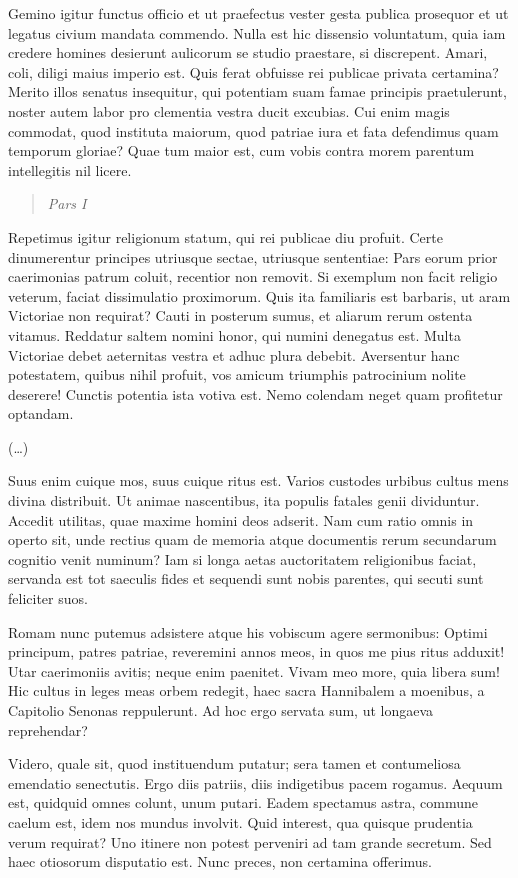 Gemino igitur functus officio et ut praefectus vester gesta publica prosequor et ut legatus civium mandata commendo. Nulla est hic dissensio voluntatum, quia iam credere homines desierunt aulicorum se studio praestare, si discrepent. Amari, coli, diligi maius imperio est. Quis ferat obfuisse rei publicae privata certamina? Merito illos senatus insequitur, qui potentiam suam famae principis praetulerunt, noster autem labor pro clementia vestra ducit excubias. Cui enim magis commodat, quod instituta maiorum, quod patriae iura et fata defendimus quam temporum gloriae? Quae tum maior est, cum vobis contra morem parentum intellegitis nil licere.

\begin{quote}
\textit{Pars I}
\end{quote}

Repetimus igitur religionum statum, qui rei publicae diu profuit. Certe dinumerentur principes utriusque sectae, utriusque sententiae: Pars eorum prior caerimonias patrum coluit, recentior non removit. Si exemplum non facit religio veterum, faciat dissimulatio proximorum. Quis ita familiaris est barbaris, ut aram Victoriae non requirat? Cauti in posterum sumus, et aliarum rerum ostenta vitamus. Reddatur saltem nomini honor, qui numini denegatus est. Multa Victoriae debet aeternitas vestra et adhuc plura debebit. Aversentur hanc potestatem, quibus nihil profuit, vos amicum triumphis patrocinium nolite deserere! Cunctis potentia ista votiva est. Nemo colendam neget quam profitetur optandam.

(\dots)

Suus enim cuique mos, suus cuique ritus est. Varios custodes urbibus cultus mens divina distribuit. Ut animae nascentibus, ita populis fatales genii dividuntur. Accedit utilitas, quae maxime homini deos adserit. Nam cum ratio omnis in operto sit, unde rectius quam de memoria atque documentis rerum secundarum cognitio venit numinum? Iam si longa aetas auctoritatem religionibus faciat, servanda est tot saeculis fides et sequendi sunt nobis parentes, qui secuti sunt feliciter suos.

Romam nunc putemus adsistere atque his vobiscum agere sermonibus: Optimi principum, patres patriae, reveremini annos meos, in quos me pius ritus adduxit! Utar caerimoniis avitis; neque enim paenitet. Vivam meo more, quia libera sum! Hic cultus in leges meas orbem redegit, haec sacra Hannibalem a moenibus, a Capitolio Senonas reppulerunt. Ad hoc ergo servata sum, ut longaeva reprehendar?

Videro, quale sit, quod instituendum putatur; sera tamen et contumeliosa emendatio senectutis. Ergo diis patriis, diis indigetibus pacem rogamus. Aequum est, quidquid omnes colunt, unum putari. Eadem spectamus astra, commune caelum est, idem nos mundus involvit. Quid interest, qua quisque prudentia verum requirat? Uno itinere non potest perveniri ad tam grande secretum. Sed haec otiosorum disputatio est. Nunc preces, non certamina offerimus.

